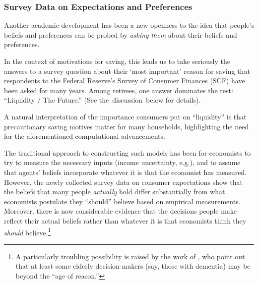 \documentclass{article}
\begin{document}
\subsubsection{Survey Data on Expectations and Preferences}

Another academic development has been a new openness to the idea that people's beliefs and preferences can be probed by \textit{asking them} about their beliefs and preferences.

In the context of motivations for saving, this leads us to take seriously the answers to a survey question about their `most important' reason for saving that respondents to the Federal Reserve's \href{https://www.federalreserve.gov/econres/scfindex.htm}{Survey of Consumer Finances (SCF)} have been asked for many years.
Among retirees, one answer dominates the rest: ``Liquidity / The Future.''  (See the~discussion~below for details).

A natural interpretation of the importance consumers put on ``liquidity'' is that precautionary saving motives matter for many households, highlighting the need for the aforementioned computational advancements.

The traditional approach to constructing such models has been for economists to try to measure the necessary inputs (income uncertainty, e.g.), and to assume that agents' beliefs incorporate whatever it is that the economist has measured.
However, the newly collected survey data on consumer expectations show that the beliefs that many people \textit{actually} hold differ substantially from what economists postulate they ``should'' believe based on empirical measurements.
Moreover, there is now considerable evidence that the decisions people make reflect their actual beliefs rather than whatever it is that economists think they \textit{should} believe.\footnote{A particularly troubling possibility is raised by the work of \cite{gabaix2010age}, who point out that at least some elderly decision-makers (say, those with dementia) may be beyond the ``age of reason.''}
\end{document}
